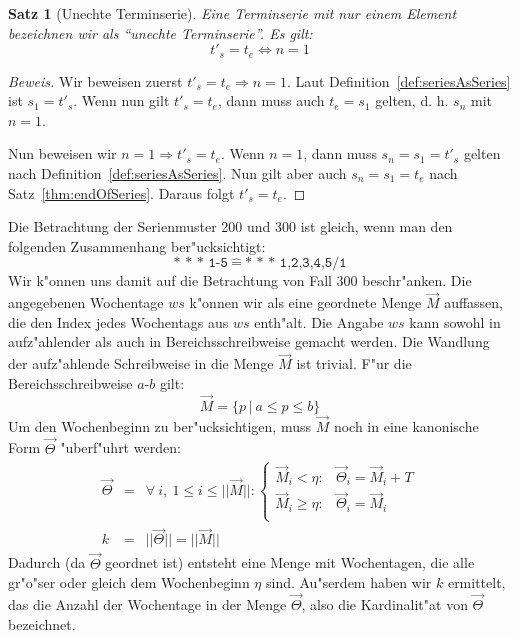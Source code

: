 \documentclass[a4paper]{article}
\numberwithin{equation}{section}
\newtheorem{thm}{Satz}
\begin{document}
\begin{thm}[Unechte Terminserie]
  Eine Terminserie mit nur einem Element bezeichnen wir als ``unechte
  Terminserie''. Es gilt:
  \begin{equation}t'_s = t_e \Leftrightarrow n = 1\end{equation}
\end{thm}
\begin{proof}[Beweis]
  Wir beweisen zuerst $t'_s = t_e \Rightarrow n = 1$. Laut
  Definition~\ref{def:seriesAsSeries} ist $s_1 = t'_s$. Wenn nun gilt
  $t'_s = t_e$, dann muss auch $t_e = s_1$ gelten, d. h. $s_n$ mit $n = 1$.
  \par
  Nun beweisen wir $n = 1 \Rightarrow t'_s = t_e$. Wenn $n = 1$, dann muss
  $s_n = s_1 = t'_s$ gelten nach Definition~\ref{def:seriesAsSeries}. Nun gilt
  aber auch $s_n = s_1 = t_e$ nach Satz~\ref{thm:endOfSeries}. Daraus folgt
  $t'_s = t_e$.
\end{proof}

Die Betrachtung der Serienmuster 200 und 300 ist gleich, wenn man den folgenden
Zusammenhang ber"ucksichtigt:
\begin{equation}
  \label{eqn:200to300}\texttt{* * * 1-5}\ \hat{=}\ \texttt{* * * 1,2,3,4,5/1}
\end{equation}
Wir k"onnen uns damit auf die Betrachtung von Fall 300 beschr"anken. Die
angegebenen Wochentage $ws$ k"onnen wir als eine geordnete Menge $\vec{M}$
auf\mbox{}fassen, die den Index jedes Wochentags aus $ws$ enth"alt. Die Angabe
$ws$ kann sowohl in aufz"ahlender als auch in Bereichsschreibweise gemacht
werden. Die Wandlung der aufz"ahlende Schreibweise in die Menge $\vec{M}$ ist
trivial. F"ur die Bereichsschreibweise $a$-$b$ gilt:
\begin{equation}\label{eqn:range}
  \vec{M} = \{ p\,|\ a \le p \le b \}
\end{equation}
Um den Wochenbeginn zu ber"ucksichtigen, muss $\vec{M}$ noch in eine kanonische
Form $\vec{\Theta}$ "uberf"uhrt werden:
\begin{eqnarray}
  \vec{\Theta} & = & \forall\ i,\ 1 \le i \le ||\vec{M}||:
  \left\{\begin{array}{ll}
  \vec{M}_i < \eta : & \vec{\Theta}_i = \vec{M}_i + T \\
  \vec{M}_i \ge \eta : & \vec{\Theta}_i = \vec{M}_i \\
  \end{array}\right. \\
  k & = & ||\vec{\Theta}|| = ||\vec{M}||
\end{eqnarray}
Dadurch (da $\vec{\Theta}$ geordnet ist) entsteht eine Menge mit Wochentagen,
die alle gr"o"ser oder gleich dem Wochenbeginn $\eta$ sind. Au"serdem haben wir
$k$ ermittelt, das die Anzahl der Wochentage in der Menge $\vec{\Theta}$, also
die Kardinalit"at von $\vec{\Theta}$ bezeichnet.
\end{document}
